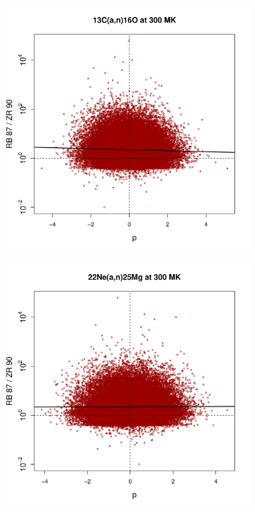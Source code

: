 \begin{figure}[t]
\centering
\begin{subfigure}[b]{0.495\textwidth}
\centering
\includegraphics[width=\textwidth]{Chapter-3/figs/CorrRB87ZR90_13C_a_n_16O_300MK.png}  
\end{subfigure}
\hfill
\begin{subfigure}[b]{0.495\textwidth}  
\centering 
\includegraphics[width=\textwidth]{Chapter-3/figs/CorrRB87ZR90_22Ne_a_n_25Mg_300MK.png}

\end{subfigure}
\end{figure}

